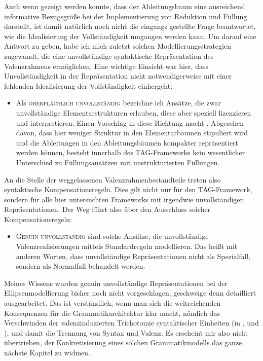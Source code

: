 Auch wenn gezeigt werden konnte, dass der Ableitungsbaum eine ausreichend informative Bezugsgröße bei der Implementierung von Reduktion und Füllung darstellt, ist damit natürlich noch nicht die eingangs gestellte Frage beantwortet, wie die Idealisierung der Vollständigkeit umgangen werden kann. Um darauf eine Antwort zu geben, habe ich mich zuletzt solchen Modellierungsstrategien zugewandt, die eine unvollständige syntaktische Repräsentation des Valenzrahmens ermöglichen. Eine wichtige Einsicht war hier, dass Unvollständigkeit in der Repräsentation nicht notwendigerweise mit einer fehlenden Idealisierung der Vollständigkeit einhergeht:
\begin{itemize}
  \item Als \textsc{oberflächlich unvollständig} bezeichne ich Ansätze, die zwar unvollständige Elementarstrukturen erlauben, diese aber speziell lizenzieren und interpretieren. Einen Vorschlag in diese Richtung macht \cite{Sarkar:97}. Abgesehen davon, dass hier weniger Struktur in den Elementarbäumen stipuliert wird und die Ableitungen in den Ableitungsbäumen kompakter repräsentiert werden können, besteht innerhalb des TAG-Frameworks kein wesentlicher Unterschied zu Füllungsansätzen mit unstrukturierten Füllungen.
\end{itemize}  
An die Stelle der weggelassenen Valenzrahmenbestandteile treten also syntaktische Kompensationsregeln. Dies gilt nicht nur für den TAG-Framework, sondern für alle hier untersuchten Frameworks mit irgendwie unvollständigen Repräsentationen. Der Weg führt also über den Ausschluss solcher Kompensationsregeln: 
\begin{itemize}   
  \item \textsc{Genuin unvollständig} sind solche Ansätze, die unvollständige Valenzrealisierungen mittels Standardregeln modellieren. Das heißt mit anderen Worten, dass unvollständige Repräsentationen nicht als Spezialfall, sondern als Normalfall behandelt werden. 
\end{itemize}
Meines Wissens wurden genuin unvollständige Repräsentationen bei der Ellipsenmodellierung bisher noch nicht vorgeschlagen, geschweige denn detailliert ausgearbeitet. Das ist verständlich, wenn man sich die weitreichenden  Konsequenzen für die Grammatikarchitektur klar macht, nämlich das Verschwinden der valenzinduzierten  Trichotomie syntaktischer Einheiten (in ,  und ), und damit die Trennung von Syntax und Valenz. Es erscheint mir also nicht übertrieben, der Konkretisierung eines solchen Grammatikmodells das ganze nächste Kapitel zu widmen.



  